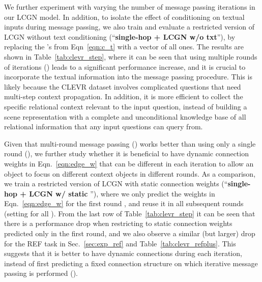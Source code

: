 \documentclass[10pt,twocolumn,letterpaper]{article}
\begin{document}
We further experiment with varying the number  of message passing iterations in our LCGN model. In addition, to isolate the effect of conditioning on textual inputs during message passing, we also train and evaluate a restricted version of LCGN without text conditioning (``\textbf{single-hop + LCGN w/o txt}''), by replacing the 's from Eqn~\ref{eqn:c_t} with a vector of all ones. The results are shown in Table~\ref{tab:clevr_step}, where it can be seen that using multiple rounds of iterations () leads to a significant performance increase, and it is crucial to incorporate the textual information  into the message passing procedure. This is likely because the CLEVR dataset involves complicated questions that need multi-step context propagation. In addition, it is more efficient to collect the specific relational context relevant to the input question, instead of building a scene representation with a complete and unconditional knowledge base of all relational information that any input questions can query from.

Given that multi-round message passing () works better than using only a single round (), we further study whether it is beneficial to have dynamic connection weights  in Eqn.~\ref{eqn:edge_w} that can be different in each iteration  to allow an object  to focus on different context objects  in different rounds. As a comparison, we train a restricted version of LCGN with static connection weights  (``\textbf{single-hop + LCGN w/ static }''), where we only predict the weights  in Eqn.~\ref{eqn:edge_w} for the first round , and reuse it in all subsequent rounds (\ie setting  for all ). From the last row of Table~\ref{tab:clevr_step} it can be seen that there is a performance drop when restricting to static connection weights  predicted only in the first round, and we also observe a similar (but larger) drop for the REF task in Sec.~\ref{sec:exp_ref} and Table~\ref{tab:clevr_refplus}. This suggests that it is better to have dynamic connections during each iteration, instead of first predicting a fixed connection structure on which iterative message passing is performed (\eg \cite{norcliffe2018learning}).
\end{document}
